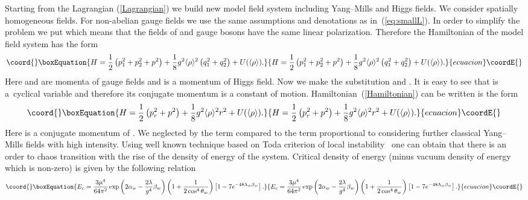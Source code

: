 \documentclass[a4paper,12pt]{article}
\begin{document}
Starting from the Lagrangian (\ref{Lagrangian}) we build new model field system
including Yang--Mills and Higgs fields. We consider spatially homogeneous fields. For
non-abelian gauge fields we use the same assumptions and denotations as
 in~(\ref{eq:smallL}). In order to simplify the problem we put \coordHE{} which means that
the fields of \coordHE{} and \coordHE{} gauge bosons have the same linear polarization.
Therefore the Hamiltonian of the model field system has the form
\begin{equation}\coord{}\boxEquation{\label{Hamiltonian}
H = \frac{1}{2}\left(p_1^2 + p_2^2 + p^2\right) + \frac{1}{8} g^{2} \langle
\rho\rangle^{2} \left(q_1^2 + q_2^2\right) + U(\langle \rho\rangle).
}{H = \frac{1}{2}\left(p_1^2 + p_2^2 + p^2\right) + \frac{1}{8} g^{2} \langle
\rho\rangle^{2} \left(q_1^2 + q_2^2\right) + U(\langle \rho\rangle).
}{ecuacion}\coordE{}\end{equation}
Here \coordHE{} and \coordHE{} are momenta of gauge fields and \coordHE{} is a momentum of Higgs field.
Now we make the substitution \coordHE{} and \coordHE{}. It
is easy to see that \myHighlight{$\varphi$}\coordHE{} is a~cyclical variable and therefore its conjugate
momentum \coordHE{} is a constant of motion.
Hamiltonian~(\ref{Hamiltonian}) can be written is the form
\begin{equation}\coord{}\boxEquation{\label{H}
  H = \frac{1}{2} \left(p_r^2 + p^2\right) + \frac{1}{8} g^{2} \langle \rho\rangle^2 r^2 +
U(\langle\rho\rangle).
}{H = \frac{1}{2} \left(p_r^2 + p^2\right) + \frac{1}{8} g^{2} \langle \rho\rangle^2 r^2 +
U(\langle\rho\rangle).
}{ecuacion}\coordE{}\end{equation}
Here \coordHE{} is a conjugate momentum of \coordHE{}. We neglected by the term \coordHE{} compared to the term proportional to \coordHE{} considering further classical
Yang--Mills fields with high intensity. Using well known technique based on Toda
criterion of local instability~\cite{Salasnich, PLA} one can obtain that there is an
order to chaos transition with the rise of the density of energy of the system.
Critical density of energy (minus vacuum density of energy which is non-zero) is given
by the following relation
\begin{equation}\coord{}\boxEquation{\label{NewE}
 E_c = \frac{3 \mu^4}{64 \pi^2} \exp{\left( 2 \alpha_w - \frac{2\lambda}{g^4}
  \beta_w \right)}\left(1 + \frac{1}{2 \cos^4{\theta_w}}\right) \left[ 1 - 7 e^{-48 \Lambda_w \beta_w}  \right].
}{E_c = \frac{3 \mu^4}{64 \pi^2} \exp{\left( 2 \alpha_w - \frac{2\lambda}{g^4}
  \beta_w \right)}\left(1 + \frac{1}{2 \cos^4{\theta_w}}\right) \left[ 1 - 7 e^{-48 \Lambda_w \beta_w}  \right].
}{ecuacion}\coordE{}\end{equation}
\end{document}
